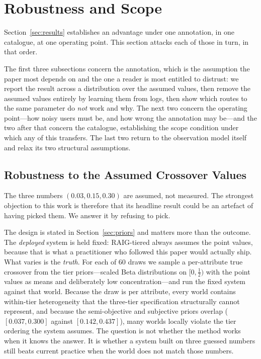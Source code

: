 \section{Robustness and Scope}
\label{sec:robustness}

Section~\ref{sec:results} establishes an advantage under one annotation, in one
catalogue, at one operating point. This section attacks each of those in turn,
in that order.

The first three subsections concern the annotation, which is the assumption the
paper most depends on and the one a reader is most entitled to distrust: we
report the result across a distribution over the assumed values, then remove
the assumed values entirely by learning them from logs, then show which routes
to the same parameter do \emph{not} work and why. The next two concern the
operating point---how noisy users must be, and how wrong the annotation may
be---and the two after that concern the catalogue, establishing the scope
condition under which any of this transfers. The last two return to the
observation model itself and relax its two structural assumptions.

\subsection{Robustness to the Assumed Crossover Values}
\label{sec:results-ensemble}

The three numbers $(0.03, 0.15, 0.30)$ are assumed, not measured. The
strongest objection to this work is therefore that its headline result could be
an artefact of having picked them. We answer it by refusing to pick.

The design is stated in Section~\ref{sec:priors} and matters more than the
outcome. The \emph{deployed} system is held fixed: RAIG-tiered always assumes
the point values, because that is what a practitioner who followed this paper
would actually ship. What varies is the \emph{truth}. For each of $60$ draws we
sample a per-attribute true crossover from the tier priors---scaled Beta
distributions on $[0,\tfrac12)$ with the point values as means and
deliberately low concentration---and run the fixed system against that world.
Because the draw is per attribute, every world contains within-tier
heterogeneity that the three-tier specification structurally cannot represent,
and because the semi-objective and subjective priors overlap
($[0.037, 0.300]$ against $[0.142, 0.437]$), many worlds locally violate the
tier ordering the system assumes. The question is not whether the method works
when it knows the answer. It is whether a system built on three guessed numbers
still beats current practice when the world does not match those numbers.

